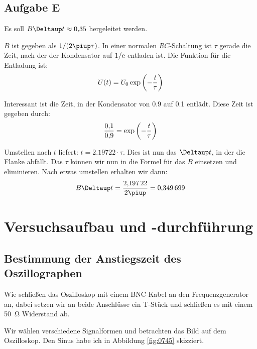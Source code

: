 \subsection{Aufgabe E}

Es soll $B \Deltaup t \approx \num{0.35}$ hergeleitet werden.

$B$ ist gegeben als $1/(2 \piup \tau)$. In einer normalen $RC$-Schaltung ist
$\tau$ gerade die Zeit, nach der der Kondensator auf $1/\mathrm e$ entladen ist. Die
Funktion für die Entladung ist:
\[
	U(t) = U_0 \exp\del{- \frac t\tau}
\]

Interessant ist die Zeit, in der Kondensator von \num{0.9} auf \num{0.1}
entlädt. Diese Zeit ist gegeben durch:
\[
	\frac{\num{0.1}}{\num{0.9}} = \exp\del{- \frac t\tau}
\]

Umstellen nach $t$ liefert: $t = \num{2.19722} \cdot \tau$. Dies ist nun das
$\Deltaup t$, in der die Flanke abfällt. Das $\tau$ können wir nun in die
Formel für das $B$ einsetzen und eliminieren. Nach etwas umstellen erhalten wir
dann:
\[
	B \Deltaup t = \frac{\num{2.19722}}{2 \piup} = \num{0.349699}
\]


\section{Versuchsaufbau und -durchführung}

\subsection{Bestimmung der Anstiegszeit des Oszillographen}

Wie schließen das Oszilloskop mit einem BNC-Kabel an den Frequenzgenerator an,
dabei setzen wir an beide Anschlüsse ein T-Stück und schließen es mit einem
\SI{50}{\ohm} Widerstand ab.

Wir wählen verschiedene Signalformen und betrachten das Bild auf dem Oszilloskop. Den Sinus habe ich in Abbildung \ref{fig:0745} skizziert.


